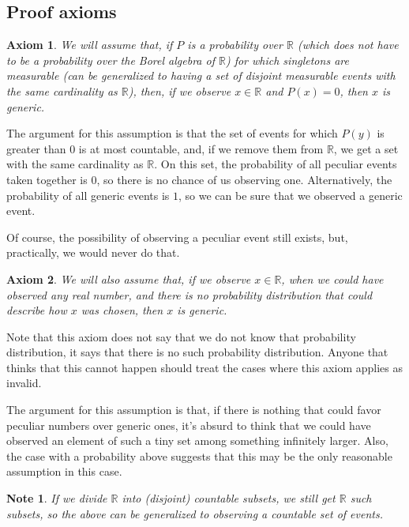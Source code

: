 \documentclass[a4paper
,draft
]{article}
\def\reale{\mathbb{R}}
\newtheorem{axiom}{Axiom}
\newtheorem{note}{Note}
\begin{document}
\subsection{Proof axioms}

\begin{axiom}
  We will assume that, if $P$ is a probability over $\reale$
  (which does not have to be a probability over the Borel algebra of $\reale$)
  for which singletons are measurable (can be generalized to having a set of
  disjoint measurable events with the same cardinality as $\reale$), then,
  if we observe $x\in\reale$ and $P(x)=0$, then $x$ is generic.
\end{axiom}

The argument for this assumption is that the set of events for which $P(y)$ is
greater than $0$ is at most countable, and, if we remove them from $\reale$, we
get a set with the same cardinality as $\reale$. On this set, the probability
of all peculiar events taken together is $0$, so there is no chance of us
observing one. Alternatively, the probability of all generic events is $1$,
so we can be sure that we observed a generic event.

Of course, the possibility of observing a peculiar event still exists, but,
practically, we would never do that.

\begin{axiom}
  We will also assume that, if we observe $x\in\reale$, when we could have
  observed any real number, and there is no probability distribution that could
  describe how $x$ was chosen, then $x$ is generic.
\end{axiom}

Note that this axiom does not say that we do not know that probability
distribution, it says that there is no such probability distribution.
Anyone that thinks that this cannot happen should treat the cases where
this axiom applies as invalid.

The argument for this assumption is that, if there is nothing that could favor
peculiar numbers over generic ones, it's absurd to think that we could have
observed an element of such a tiny set among something infinitely larger.
Also, the case with a probability above suggests that this may be the only
reasonable assumption in this case.

\begin{note}
  If we divide $\reale$ into (disjoint) countable subsets, we still get $\reale$
  such subsets, so the above can be generalized to observing a countable set
  of events.
\end{note}
\end{document}

